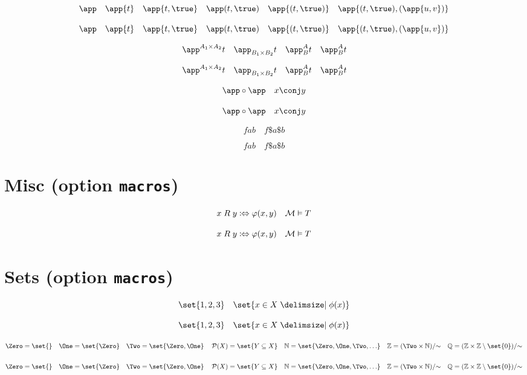 \documentclass{article}
\begin{document}
\begin{verbatim*}
\[
\app\quad
\app{t}\quad
\app{t,\true}\quad
\app(t,\true)\quad
\app{(t,\true)}\quad
\app{(t,\true),(\app{u,v})}
\]
\end{verbatim*}
%
\[
  \app              \quad
  \app{t}           \quad
  \app{t,\true}     \quad
  \app(t,\true)     \quad
  \app{(t,\true)} \quad
  \app{(t,\true),(\app{u,v})}
\]

\begin{verbatim*}
\[
\app^{A_1\times A_2}{t}\quad
\app_{B_1\times B_2}{t}\quad
\app^A_B{t}\quad
\app_B^A{t}
\]
\end{verbatim*}
%
\[
  \app^{A_1 \times A_2}{t} \quad
  \app_{B_1 \times B_2}{t} \quad
  \app^A_B{t}              \quad
  \app_B^A{t}
\]

\begin{verbatim*}
\[
\app \circ \app\quad
x \conj y
\]
\end{verbatim*}
%
\[
  \app \circ \app\quad
  x \conj y
\]

\begin{verbatim*}
\[
f a b\quad
f\$a\$b
\]
\end{verbatim*}
%
\[
  f a b \quad
  f\$a\$b
\]

\section{Misc (option \texttt{macros})}

\begin{verbatim*}
\[
x\mathrel{R}y\coloniff\varphi(x,y)\quad
\Mod[M]\vDash T
\]
\end{verbatim*}
%
\[
  x \mathrel{R} y \coloniff \varphi(x,y) \quad
  \Mod[M] \vDash T
\]

\section{Sets (option \texttt{macros})}

\begin{verbatim*}
\[
\set{1,2,3}\quad
\set{x\in X\given\phi(x)}
\]
\end{verbatim*}
%
\[
  \set{ 1, 2, 3 } \quad
  \set{ x \in X \given \phi(x) }
\]

\begin{verbatim*}
\[
\Zero =\set{}\quad
\One =\set{\Zero}\quad
\Two =\set{\Zero,\One}\quad
\Powerset(X)=\set{Y\subseteq X}\quad
\Nats =\set{\Zero,\One,\Two,\ldots}\quad
\Ints =\Quot{(\Two\times\Nats)}{{\sim}}\quad
\Rats =\Quot{(\Ints\times\Ints\setminus\set{0})}{{\sim}}
\]
\end{verbatim*}
%
\[
  \Zero        = \set{ } \quad
  \One         = \set{ \Zero } \quad
  \Two         = \set{ \Zero, \One } \quad
  \Powerset(X) = \set{ Y \subseteq X } \quad
  \Nats        = \set{ \Zero, \One, \Two,\ldots } \quad
  \Ints        = \Quot{(\Two  \times \Nats)}{{\sim}} \quad
  \Rats        = \Quot{(\Ints \times \Ints \setminus \set{ 0 })}{{\sim}}
\]
\end{document}

